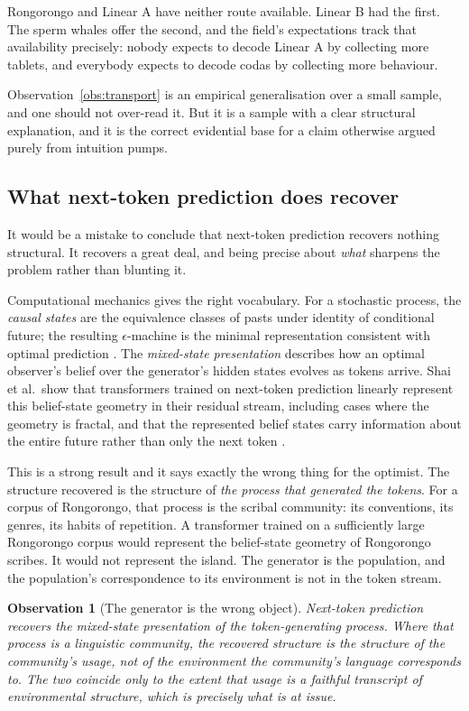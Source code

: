 \documentclass[11pt,a4paper]{article}
\theoremstyle{definition}
\theoremstyle{plain}
\newtheorem{observation}[definition]{Observation}
\theoremstyle{remark}
\begin{document}
\noindent Rongorongo and Linear A have neither route available. Linear B had the first.
The sperm whales offer the second, and the field's expectations track that availability
precisely: nobody expects to decode Linear A by collecting more tablets, and everybody
expects to decode codas by collecting more behaviour.

Observation~\ref{obs:transport} is an empirical generalisation over a small sample, and
one should not over-read it. But it is a sample with a clear structural explanation, and
it is the correct evidential base for a claim otherwise argued purely from intuition
pumps.

\subsection{What next-token prediction does recover}
\label{sec:recovers}

It would be a mistake to conclude that next-token prediction recovers nothing structural.
It recovers a great deal, and being precise about \emph{what} sharpens the problem rather
than blunting it.

Computational mechanics gives the right vocabulary. For a stochastic process, the
\emph{causal states} are the equivalence classes of pasts under identity of conditional
future; the resulting $\epsilon$-machine is the minimal representation consistent with
optimal prediction \cite{shalizi2001}. The \emph{mixed-state presentation} describes how
an optimal observer's belief over the generator's hidden states evolves as tokens arrive.
Shai et al.\ show that transformers trained on next-token prediction linearly represent
this belief-state geometry in their residual stream, including cases where the geometry is
fractal, and that the represented belief states carry information about the entire future
rather than only the next token \cite{shai2024}.

This is a strong result and it says exactly the wrong thing for the optimist. The
structure recovered is the structure of \emph{the process that generated the tokens}. For
a corpus of Rongorongo, that process is the scribal community: its conventions, its
genres, its habits of repetition. A transformer trained on a sufficiently large
Rongorongo corpus would represent the belief-state geometry of Rongorongo scribes. It
would not represent the island. The generator is the population, and the population's
correspondence to its environment is not in the token stream.

\begin{observation}[The generator is the wrong object]
\label{obs:generator}
Next-token prediction recovers the mixed-state presentation of the token-generating
process. Where that process is a linguistic community, the recovered structure is the
structure of the community's usage, not of the environment the community's language
corresponds to. The two coincide only to the extent that usage is a faithful transcript of
environmental structure, which is precisely what is at issue.
\end{observation}
\end{document}
